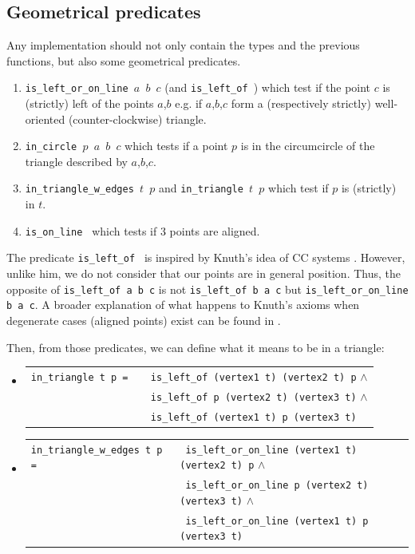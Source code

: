 \documentclass[a4paper,10pt]{article}
\def\ttt#1#2{{\tt{\color{black}#1} #2}}
\begin{document}
\subsection{Geometrical predicates}
\label{predicate}
Any implementation should not only contain the types and the previous functions, but also some geometrical predicates.
\begin{enumerate}
\item \ttt{is\_left\_or\_on\_line}{$a$ $b$ $c$} (and \ttt{is\_left\_of}{}) which test if the point $c$ is (strictly) left of the points $a$,$b$ e.g. if $a$,$b$,$c$ form a (respectively strictly) well-oriented (counter-clockwise) triangle.
\item \ttt{in\_circle}{$p$ $a$ $b$ $c$} which tests if a point $p$ is in the circumcircle of the triangle described by $a$,$b$,$c$.
\item \ttt{in\_triangle\_w\_edges}{$t$ $p$} and \ttt{in\_triangle}{$t$ $p$} which test if $p$ is (strictly) in $t$.
  \item \ttt{is\_on\_line}{} which tests if 3 points are aligned.

\end{enumerate}

  The predicate \ttt{is\_left\_of}{} is inspired by Knuth's idea of CC systems \cite{Knuth92}.
  However, unlike him, we do not consider that our points are in general position. Thus, the opposite of \ttt{is\_left\_of}{a b c} is not \ttt{is\_left\_of}{b a c} but \ttt{is\_left\_or\_on\_line}{b a c}. A broader explanation of what happens to Knuth's axioms when degenerate cases (aligned points) exist can be found in \cite{Hull}. \label{knuthpic}

  Then, from those predicates, we can define what it means to be in a triangle:
  \begin{itemize}
    \item \begin{tabular}{ll}
       \ttt {in\_triangle}{t p = }& \ttt{}{is\_left\_of (vertex1 t) (vertex2 t) p} $\wedge$\\
        &\ttt{}{is\_left\_of p (vertex2 t) (vertex3 t)} $\wedge$\\
  & \ttt{}{is\_left\_of (vertex1 t) p (vertex3 t)}
      \end{tabular}
\item \begin{tabular}{ll}
       \ttt{in\_triangle\_w\_edges t p}{= }& \ttt{}{is\_left\_or\_on\_line (vertex1 t) (vertex2 t) p} $\wedge$\\
        & \ttt{}{is\_left\_or\_on\_line p  (vertex2 t) (vertex3 t)} $\wedge$\\
  & \ttt{}{is\_left\_or\_on\_line (vertex1 t) p (vertex3 t)}
      \end{tabular}
      \end{itemize}
\end{document}

